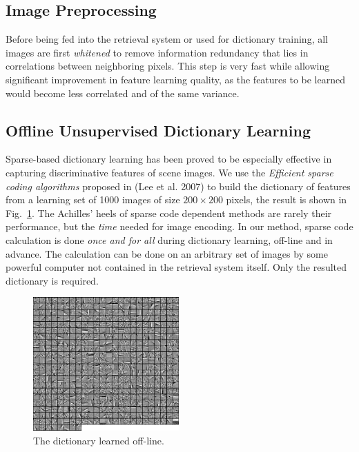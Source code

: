 \documentclass[letterpaper]{article}
\begin{document}
\subsection{Image Preprocessing}
Before being fed into the retrieval system or used for dictionary training, all images are first \emph{whitened} to remove information redundancy that lies in correlations between neighboring pixels. This step is very fast while allowing significant improvement in feature learning quality, as the features to be learned would become less correlated and of the same variance. 

\subsection{Offline Unsupervised Dictionary Learning}
\label{subsec:dictionary}
Sparse-based dictionary learning has been proved to be especially effective in capturing discriminative features of scene images. We use the \emph{Efficient sparse coding algorithms} proposed in (Lee et al. 2007) to build the dictionary of features from a learning set of 1000 images of size $200\times200$ pixels, the result is shown in Fig.~\ref{dictionary}. The Achilles' heels of sparse code dependent methods are rarely their performance, but the \emph{time} needed for image encoding. In our method, sparse code calculation is done \emph{once and for all} during dictionary learning, off-line and in advance. The calculation can be done on an arbitrary set of images by some powerful computer not contained in the retrieval system itself. Only the resulted dictionary is required.

\begin{figure}[!ht]
		\centering
		\includegraphics[width=2.2in]{figures_dir/dict.png}
		\caption{The dictionary learned off-line.}
		\label{dictionary}
\end{figure}
\end{document}
